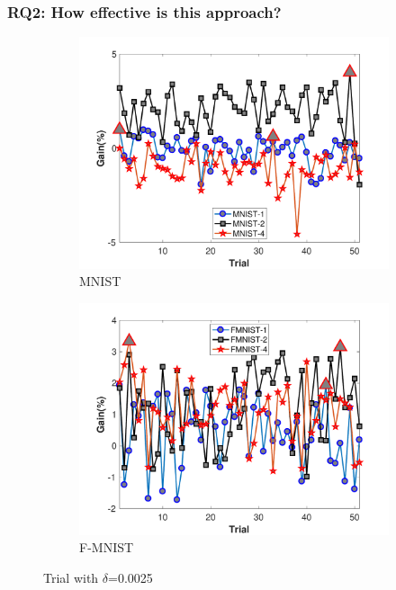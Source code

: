 \subsubsection{\textbf{RQ2: How effective is this approach?}}
\begin{figure}
	\begin{subfigure}[b]{.46\linewidth}{}
		\includegraphics[keepaspectratio = True, scale = 0.31]{figures/MNIST_25}
		\centering
		\caption{MNIST}
	\end{subfigure}
	\begin{subfigure}[b]{.46\linewidth}
		\includegraphics[keepaspectratio = True, scale = 0.31]{figures/FMNIST_25}
		\caption{F-MNIST}
	\end{subfigure}
	\caption{Trial with $\delta$=0.0025}
	\label{fig:trial1}
\end{figure}
